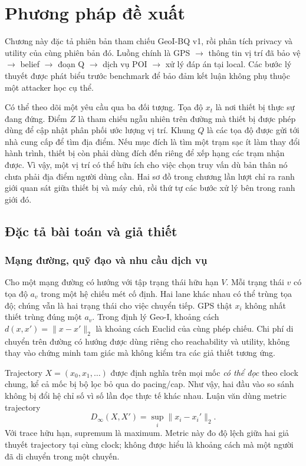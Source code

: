 \chapter{Phương pháp đề xuất}\label{ch:method}
Chương này đặc tả phiên bản tham chiếu GeoI-BQ v1, rồi phân tích privacy và utility của cùng phiên
bản đó. Luồng chính là GPS $\rightarrow$ thông tin vị trí đã bảo vệ $\rightarrow$ belief $\rightarrow$
đoạn Q $\rightarrow$ dịch vụ POI $\rightarrow$ xử lý đáp án tại local. Các bước lý thuyết được phát
biểu trước benchmark để bảo đảm kết luận không phụ thuộc một attacker học cụ thể.

Có thể theo dõi một yêu cầu qua ba đối tượng. Tọa độ $x_t$ là nơi thiết bị thực sự đang đứng.
Điểm $Z$ là tham chiếu ngẫu nhiên trên đường mà thiết bị được phép dùng để cập nhật phân phối
ước lượng vị trí. Khung $Q$ là các tọa độ được gửi tới nhà cung cấp để tìm địa điểm. Nếu mục
đích là tìm một trạm sạc ít làm thay đổi hành trình, thiết bị còn phải dùng đích đến riêng để
xếp hạng các trạm nhận được. Vì vậy, một vị trí có thể hữu ích cho việc chọn truy vấn dù bản
thân nó chưa phải địa điểm người dùng cần. Hai sơ đồ trong chương lần lượt chỉ ra ranh giới
quan sát giữa thiết bị và máy chủ, rồi thứ tự các bước xử lý bên trong ranh giới đó.

\section{Đặc tả bài toán và giả thiết}\label{sec:formulation}
\subsection{Mạng đường, quỹ đạo và nhu cầu dịch vụ}
Cho một mạng đường có hướng với tập trạng thái hữu hạn $V$. Mỗi trạng thái $v$ có tọa độ $a_v$ trong
một hệ chiếu mét cố định. Hai lane khác nhau có thể trùng tọa độ; chúng vẫn là hai trạng thái cho
việc chuyển tiếp. GPS thật $x_i$ không nhất thiết trùng đúng một $a_v$. Trong định lý Geo-I, khoảng
cách $d(x,x')=\|x-x'\|_2$ là khoảng cách Euclid của cùng phép chiếu. Chi phí di chuyển trên đường có
hướng được dùng riêng cho reachability và utility, không thay vào chứng minh tam giác mà không kiểm
tra các giả thiết tương ứng.

Trajectory $X=(x_0,x_1,\ldots)$ được định nghĩa trên mọi mốc \emph{có thể đọc} theo clock chung, kể cả
mốc bị bộ lọc bỏ qua do pacing/cap. Như vậy, hai đầu vào so sánh không bị đổi hệ chỉ số vì số lần đọc
thực tế khác nhau. Luận văn dùng metric trajectory
\begin{equation}
D_\infty(X,X')=\sup_i\|x_i-x_i'\|_2.
\label{eq:trajectory-metric}
\end{equation}
Với trace hữu hạn, supremum là maximum. Metric này đo độ lệch giữa hai giả thuyết trajectory tại
cùng clock; không được hiểu là khoảng cách mà một người đã di chuyển trong một chuyến.

